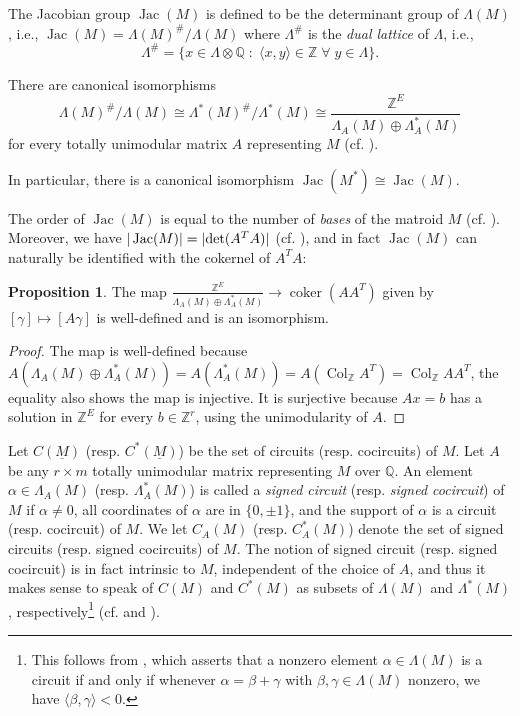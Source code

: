 \documentclass[12pt]{amsart}
\newcommand{\QQ}{\mathbb{Q}}
\newcommand{\ZZ}{\mathbb{Z}}
\numberwithin{equation}{section}
\theoremstyle{definition}
\newtheorem{proposition}[theorem]{Proposition}
\newcommand{\Col}{\operatorname{Col}}
\newcommand{\Jac}{\operatorname{Jac}}
\newcommand{\coker}{\operatorname{coker}}
\begin{document}
\medskip

The Jacobian group $\Jac(M)$ is defined to be the determinant group of $\Lambda(M)$, i.e., $\Jac(M) = \Lambda(M)^\# / \Lambda(M)$ where $\Lambda^\#$ is the {\em dual lattice} of $\Lambda$, i.e.,
\[
\Lambda^\# = \{ x \in \Lambda \otimes \QQ \; : \; \langle x,y \rangle \in \ZZ \; \forall \; y \in \Lambda \}.
\]

There are canonical isomorphisms 
\begin{equation} \label{eq:canonisom}
\Lambda(M)^\# / \Lambda(M) \cong \Lambda^*(M)^\# / \Lambda^*(M) \cong \frac{\ZZ^E}{\Lambda_A(M) \oplus \Lambda_A^*(M)}
\end{equation}
for every totally unimodular matrix $A$ representing $M$ (cf. \cite[Lemma~1 of \S{4}]{bacher1997lattice}).

In particular, there is a canonical isomorphism $\Jac(M^*) \cong \Jac(M)$.

The order of $\Jac(M)$ is equal to the number of {\em bases} of the matroid $M$ (cf. \cite[Theorem 4.3.2]{merino1999matroids}).
Moreover, we have $|\Jac(M)| = |{\rm det}(A^T A)|$ (cf. \cite[p.317]{godsil2013algebraic}), and in fact $\Jac(M)$ can naturally be identified with the cokernel of $A^T A$:

\begin{proposition}
The map $\frac{\ZZ^E}{\Lambda_A(M) \oplus \Lambda_A^*(M)}\rightarrow\coker(AA^T)$ given by $[\gamma]\mapsto [A\gamma]$ is well-defined and is an isomorphism.
\end{proposition}

\begin{proof}
The map is well-defined because $A(\Lambda_A(M) \oplus \Lambda_A^*(M))=A(\Lambda_A^*(M))=A(\Col_{\mathbb{Z}}A^T)=\Col_{\mathbb{Z}}AA^T$, the equality also shows the map is injective. It is surjective because $Ax=b$ has a solution in $\ZZ^E$ for every $b\in\mathbb{Z}^r$, using the unimodularity of $A$.
\end{proof} 

Let $C(\underline{M})$ (resp. $C^*(\underline{M})$) be the set of circuits (resp. cocircuits) of $M$.  
Let $A$ be any $r \times m$ totally unimodular matrix representing $M$ over $\QQ$.
An element $\alpha \in \Lambda_A(M)$ (resp. $\Lambda_A^*(M)$) is called a {\em signed circuit} (resp. {\em signed cocircuit}) of $M$ if $\alpha \neq 0$,
all coordinates of $\alpha$ are in $\{ 0, \pm 1 \}$, and the support of $\alpha$ is a circuit (resp. cocircuit) of $M$.
We let $C_A(M)$ (resp. $C^*_A(M)$) denote the set of signed circuits (resp. signed cocircuits) of $M$.
The notion of signed circuit (resp. signed cocircuit) is in fact intrinsic to $M$, independent of the choice of $A$, and thus it makes sense to speak of $C(M)$ and $C^*(M)$
as subsets of $\Lambda(M)$ and $\Lambda^*(M)$, respectively\footnote{This follows from \cite[Proposition 12]{su2010lattice}, which asserts that a nonzero element $\alpha \in \Lambda(M)$ is a circuit if and only if whenever $\alpha = \beta + \gamma$ with $\beta,\gamma \in \Lambda(M)$ nonzero, we have $\langle \beta, \gamma \rangle < 0$.} (cf. \cite[Lemma~10 and Proposition~12]{su2010lattice} and \cite[Theorem~4.3.4]{merino1999matroids}).
\end{document}
